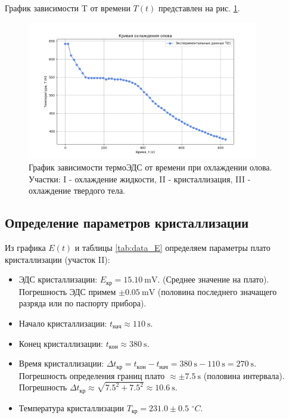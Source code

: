 \documentclass[a4paper]{article}
\begin{document}
График зависимости T от времени $T(t)$ представлен на рис. \ref{fig:graph_T_t}.
\begin{figure}[H]
\centering
\includegraphics[width=0.9\textwidth]{fig_1} %
\caption{График зависимости термоЭДС от времени при охлаждении олова. Участки: I - охлаждение жидкости, II - кристаллизация, III - охлаждение твердого тела.}
\label{fig:graph_T_t}
\end{figure}

\subsection{Определение параметров кристаллизации}

Из графика $E(t)$ и таблицы \ref{tab:data_E} определяем параметры плато кристаллизации (участок II):
\begin{itemize}
    \item ЭДС кристаллизации: $E_{кр} = \SI{15.10}{\milli\volt}$. (Среднее значение на плато). Погрешность ЭДС примем $\pm \SI{0.05}{\milli\volt}$ (половина последнего значащего разряда или по паспорту прибора).
    \item Начало кристаллизации: $t_{нач} \approx \SI{110}{\second}$.
    \item Конец кристаллизации: $t_{кон} \approx \SI{380}{\second}$.
    \item Время кристаллизации: $\Delta t_{кр} = t_{кон} - t_{нач} = \SI{380}{\second} - \SI{110}{\second} = \SI{270}{\second}$.
    Погрешность определения границ плато $\approx \pm \SI{7.5}{\s}$ (половина интервала). Погрешность $\Delta t_{кр} \approx \sqrt{7.5^2 + 7.5^2} \approx \SI{10.6}{\s}$.
\item Температура кристаллизации $T_{\text{кр}} = 231.0 \pm 0.5 $ $^{\circ}C$.
\end{itemize}
\end{document}
